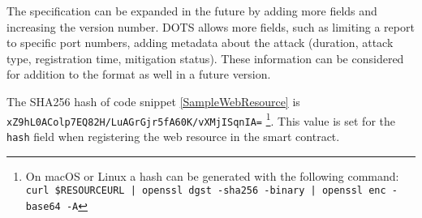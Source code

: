 The specification can be expanded in the future by adding more fields and increasing the version number. DOTS \cite{IETFDraft} allows more fields, such as limiting a report to specific port numbers, adding metadata about the attack (duration, attack type, registration time, mitigation status). These information can be considered for addition to the format as well in a future version.

The SHA256 hash of code snippet \ref{SampleWebResource} is \texttt{xZ9hL0AColp7EQ82H/LuAGrGjr5fA60K/vXMjISqnIA=} \footnote{On macOS or Linux a hash can be generated with the following command: \texttt{curl \$RESOURCEURL | openssl dgst -sha256 -binary | openssl enc -base64 -A}}. This value is set for the \texttt{hash} field when registering the web resource in the smart contract.
